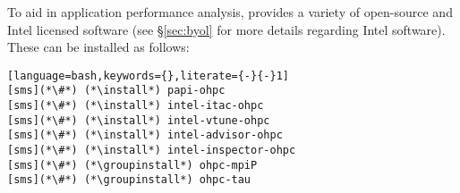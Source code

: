 To aid in application performance analysis, \OHPC{} provides a variety of
open-source and Intel licensed software (see \S\ref{sec:byol} for more details
regarding Intel software). These can be installed as follows:

\begin{lstlisting}[language=bash,keywords={},literate={-}{-}1]
[sms](*\#*) (*\install*) papi-ohpc
[sms](*\#*) (*\install*) intel-itac-ohpc
[sms](*\#*) (*\install*) intel-vtune-ohpc
[sms](*\#*) (*\install*) intel-advisor-ohpc
[sms](*\#*) (*\install*) intel-inspector-ohpc
[sms](*\#*) (*\groupinstall*) ohpc-mpiP
[sms](*\#*) (*\groupinstall*) ohpc-tau
\end{lstlisting}


